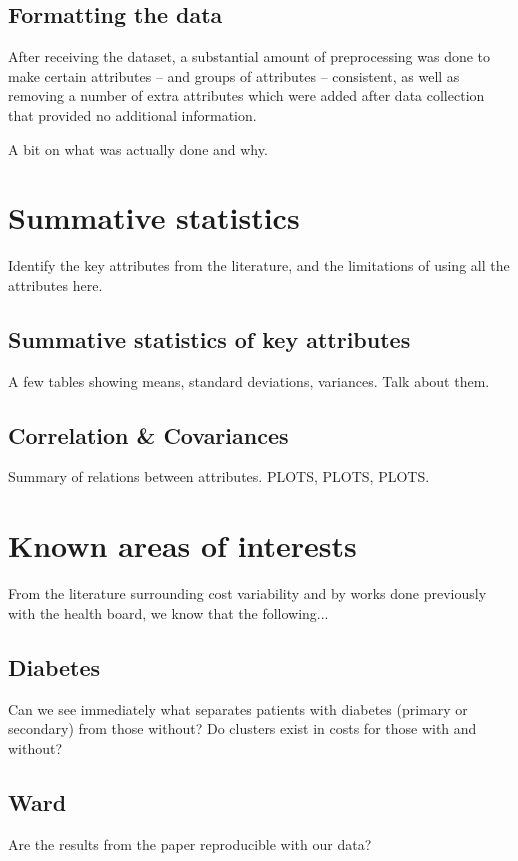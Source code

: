 \documentclass{article}
\begin{document}
\subsection{Formatting the data}\label{subsection:formatting}

After receiving the dataset, a substantial amount of preprocessing was done to
make certain attributes -- and groups of attributes -- consistent, as well as
removing a number of extra attributes which were added after data collection
that provided no additional information.

A bit on what was actually done and why.


\section{Summative statistics}\label{section:summative}

Identify the key attributes from the literature, and the limitations of using
all the attributes here.

\subsection{Summative statistics of key attributes}\label{subsection:summative}

A few tables showing means, standard deviations, variances. Talk about them.

\subsection{Correlation \& Covariances}\label{subsection:corr-cov}

Summary of relations between attributes. PLOTS, PLOTS, PLOTS.




\section{Known areas of interests}\label{section:known}

From the literature surrounding cost variability and by works done previously
with the health board, we know that the following...

\subsection{Diabetes}\label{subsection:diabetes}

Can we see immediately what separates patients with diabetes (primary or
secondary) from those without? Do clusters exist in costs for those with and
without?

\subsection{Ward}\label{subsection:ward}

Are the results from the paper reproducible with our data?


\end{document}
